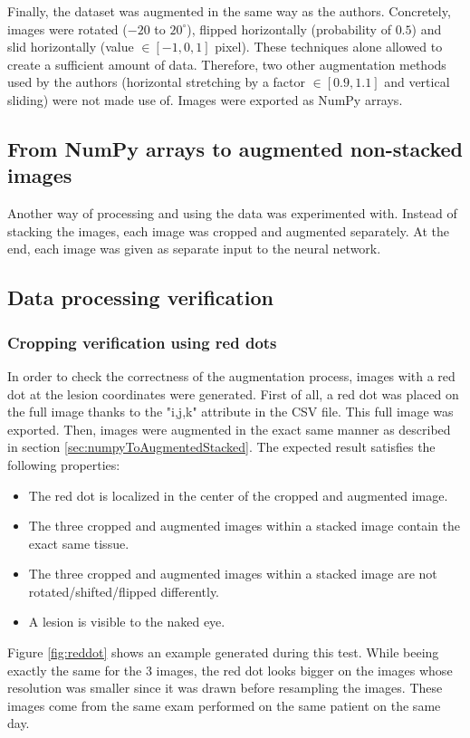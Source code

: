 Finally, the dataset was augmented in the same way as the authors. Concretely, images were rotated ($-20$ to $20^\circ$), flipped horizontally (probability of $0.5$) and slid horizontally (value $\in [-1, 0, 1]$ pixel). These techniques alone allowed to create a sufficient amount of data. Therefore, two other augmentation methods used by the authors (horizontal stretching by a factor $\in [0.9,1.1]$ and vertical sliding) were not made use of. Images were exported as NumPy arrays.


\subsection{From NumPy arrays to augmented non-stacked images}
Another way of processing and using the data was experimented with. Instead of stacking the images, each image was cropped and augmented separately. At the end, each image was given as separate input to the neural network. 


\subsection{Data processing verification}
\label{sec:dataProcessingVerification}

\subsubsection{Cropping verification using red dots}
In order to check the correctness of the augmentation process, images with a red dot at the lesion coordinates were generated. First of all, a red dot was placed on the full image thanks to the "i,j,k" attribute in the CSV file. This full image was exported. Then, images were augmented in the exact same manner as described in section \ref{sec:numpyToAugmentedStacked}. The expected result satisfies the following properties:
\begin{itemize}
	\item The red dot is localized in the center of the cropped and augmented image.
	\item The three cropped and augmented images within a stacked image contain the exact same tissue. 
	\item The three cropped and augmented images within a stacked image are not rotated/shifted/flipped differently. 
	\item A lesion is visible to the naked eye. 
\end{itemize}

\noindent Figure \ref{fig:reddot} shows an example generated during this test. While beeing exactly the same for the 3 images, the red dot looks bigger on the images whose resolution was smaller since it was drawn before resampling the images. These images come from the same exam performed on the same patient on the same day. 

